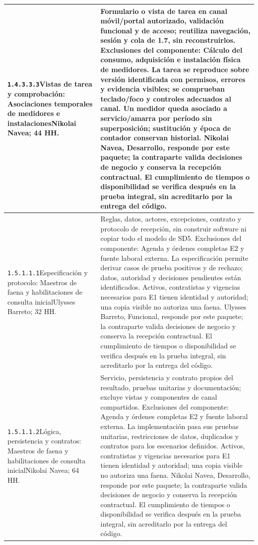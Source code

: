 \begin{longtable}{L{52mm}L{91mm}}
\texttt{1.\allowbreak{}4.\allowbreak{}3.\allowbreak{}3.\allowbreak{}3}\newline Vistas de tarea y comprobación: Asociaciones temporales de medidores e instalaciones\newline Nikolai Navea; 44 HH. & Formulario o vista de tarea en canal móvil/portal autorizado, validación funcional y de acceso; reutiliza navegación, sesión y cola de 1.7, sin reconstruirlos. Exclusiones del componente: Cálculo del consumo, adquisición e instalación física de medidores. La tarea se reproduce sobre versión identificada con permisos, errores y evidencia visibles; se comprueban teclado/foco y controles adecuados al canal. Un medidor queda asociado a servicio/amarra por período sin superposición; sustitución y época de contador conservan historial. Nikolai Navea, Desarrollo, responde por este paquete; la contraparte valida decisiones de negocio y conserva la recepción contractual. El cumplimiento de tiempos o disponibilidad se verifica después en la prueba integral, sin acreditarlo por la entrega del código.\\\hline
\texttt{1.\allowbreak{}5.\allowbreak{}1.\allowbreak{}1.\allowbreak{}1}\newline Especificación y protocolo: Maestros de faena y habilitaciones de consulta inicial\newline Ulysses Barreto; 32 HH. & Reglas, datos, actores, excepciones, contrato y protocolo de recepción, sin construir software ni copiar todo el modelo de SD5. Exclusiones del componente: Agenda y órdenes completas E2 y fuente laboral externa. La especificación permite derivar casos de prueba positivos y de rechazo; datos, autoridad y decisiones pendientes están identificados. Activos, contratistas y vigencias necesarios para E1 tienen identidad y autoridad; una copia visible no autoriza una faena. Ulysses Barreto, Funcional, responde por este paquete; la contraparte valida decisiones de negocio y conserva la recepción contractual. El cumplimiento de tiempos o disponibilidad se verifica después en la prueba integral, sin acreditarlo por la entrega del código.\\\hline
\texttt{1.\allowbreak{}5.\allowbreak{}1.\allowbreak{}1.\allowbreak{}2}\newline Lógica, persistencia y contratos: Maestros de faena y habilitaciones de consulta inicial\newline Nikolai Navea; 64 HH. & Servicio, persistencia y contrato propios del resultado, pruebas unitarias y documentación; excluye vistas y componentes de canal compartidos. Exclusiones del componente: Agenda y órdenes completas E2 y fuente laboral externa. La implementación pasa sus pruebas unitarias, restricciones de datos, duplicados y contratos para los escenarios definidos. Activos, contratistas y vigencias necesarios para E1 tienen identidad y autoridad; una copia visible no autoriza una faena. Nikolai Navea, Desarrollo, responde por este paquete; la contraparte valida decisiones de negocio y conserva la recepción contractual. El cumplimiento de tiempos o disponibilidad se verifica después en la prueba integral, sin acreditarlo por la entrega del código.\\\hline

\end{longtable}
